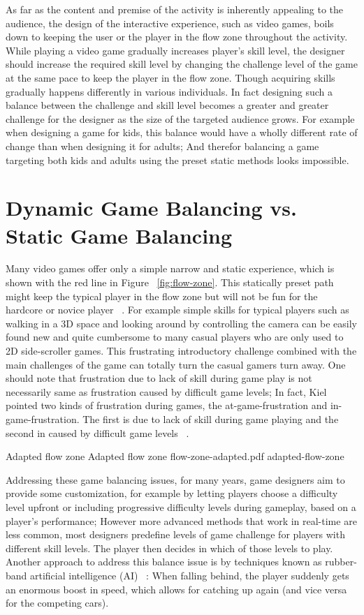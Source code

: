 As far as the content and premise of the activity is inherently appealing to the audience, the design of the interactive experience, such as video games, boils down to keeping the user or the player in the flow zone throughout the activity. While playing a video game gradually increases player's skill level, the designer should increase the required skill level by changing the challenge level of the game at the same pace to keep the player in the flow zone. Though acquiring skills gradually happens differently in various individuals. In fact designing such a balance between the challenge and skill level becomes a greater and greater challenge for the designer as the size of the targeted audience grows. For example when designing a game for kids, this balance would have a wholly different rate of change than when designing it for adults; And therefor balancing a game targeting both kids and adults using the preset static methods looks impossible.

\section{Dynamic Game Balancing vs. Static Game Balancing }

Many video games offer only a simple narrow and static experience, which is shown with the red line in Figure ~\ref{fig:flow-zone}. This statically preset path might keep the typical player in the flow zone but will not be fun for the hardcore or novice player ~\cite{chen2007flow}. For example simple skills for typical players such as walking in a 3D space and looking around by controlling the camera can be easily found new and quite cumbersome to many casual players who are only used to 2D side-scroller games. This frustrating introductory challenge combined with the main challenges of the game can totally turn the casual gamers turn away. One should note that frustration due to lack of skill during game play is not necessarily same as frustration caused by difficult game levels; In fact, Kiel pointed two kinds of frustration during games, the at-game-frustration and in-game-frustration. The first is due to lack of skill during game playing and the second in caused by difficult game levels ~\cite{gilleade2004using}.

\img
{Adapted flow zone}
{Adapted flow zone}
{flow-zone-adapted.pdf}
{adapted-flow-zone}

Addressing these game balancing issues, for many years, game designers aim to provide some customization, for example by letting players choose a difficulty level upfront or including progressive difficulty levels during gameplay, based on a player's performance; However more advanced methods that work in real-time are less common, most designers predefine levels of game challenge for players with different skill levels. The player then decides in which of those levels to play. Another approach to address this balance issue is by techniques known as rubber-band artificial intelligence (AI) ~\cite{champandard2003ai}: When falling behind, the player suddenly gets an enormous boost in speed, which allows for catching up again (and vice versa for the competing cars).


